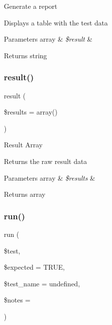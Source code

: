 Generate a report

Displays a table with the test data


\begin{DoxyParams}[1]{Parameters}
array & {\em \$result} & \\
\hline
\end{DoxyParams}
\begin{DoxyReturn}{Returns}
string 
\end{DoxyReturn}
\mbox{\label{class_c_i___unit__test_adcfdd404b2f2610e0690b4beb7786ce5}} 
\subsubsection{\texorpdfstring{result()}{result()}}
{\footnotesize\ttfamily result (\begin{DoxyParamCaption}\item[{}]{\$results = {\ttfamily array()} }\end{DoxyParamCaption})}

Result Array

Returns the raw result data


\begin{DoxyParams}[1]{Parameters}
array & {\em \$results} & \\
\hline
\end{DoxyParams}
\begin{DoxyReturn}{Returns}
array 
\end{DoxyReturn}
\mbox{\label{class_c_i___unit__test_a0bb74f4cb9553ace4034633e69383c55}} 
\subsubsection{\texorpdfstring{run()}{run()}}
{\footnotesize\ttfamily run (\begin{DoxyParamCaption}\item[{}]{\$test,  }\item[{}]{\$expected = {\ttfamily TRUE},  }\item[{}]{\$test\+\_\+name = {\ttfamily \textquotesingle{}undefined\textquotesingle{}},  }\item[{}]{\$notes = {\ttfamily \textquotesingle{}\textquotesingle{}} }\end{DoxyParamCaption})}

